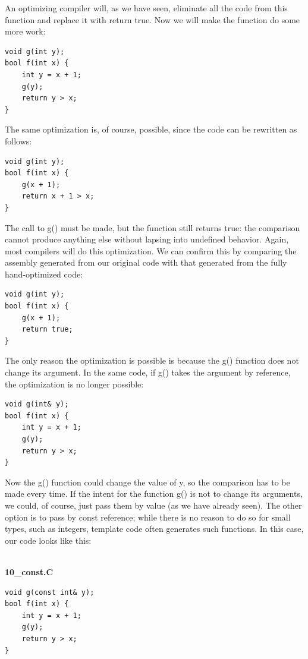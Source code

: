 An optimizing compiler will, as we have seen, eliminate all the code from this function and replace it with return true. Now we will make the function do some more work:

\begin{lstlisting}[style=styleCXX]
void g(int y);
bool f(int x) {
	int y = x + 1;
	g(y);
	return y > x;
}
\end{lstlisting}

The same optimization is, of course, possible, since the code can be rewritten as follows:

\begin{lstlisting}[style=styleCXX]
void g(int y);
bool f(int x) {
	g(x + 1);
	return x + 1 > x;
}
\end{lstlisting}

The call to g() must be made, but the function still returns true: the comparison cannot produce anything else without lapsing into undefined behavior. Again, most compilers will do this optimization. We can confirm this by comparing the assembly generated from our original code with that generated from the fully hand-optimized code:

\begin{lstlisting}[style=styleCXX]
void g(int y);
bool f(int x) {
	g(x + 1);
	return true;
}
\end{lstlisting}

The only reason the optimization is possible is because the g() function does not change its argument. In the same code, if g() takes the argument by reference, the optimization is no longer possible:

\begin{lstlisting}[style=styleCXX]
void g(int& y);
bool f(int x) {
	int y = x + 1;
	g(y);
	return y > x;
}
\end{lstlisting}

Now the g() function could change the value of y, so the comparison has to be made every time. If the intent for the function g() is not to change its arguments, we could, of course, just pass them by value (as we have already seen). The other option is to pass by const reference; while there is no reason to do so for small types, such as integers, template code often generates such functions. In this case, our code looks like this:

\hspace*{\fill} \\ %
\noindent
\textbf{10\_const.C}
\begin{lstlisting}[style=styleCXX]
void g(const int& y);
bool f(int x) {
	int y = x + 1;
	g(y);
	return y > x;
}
\end{lstlisting}

